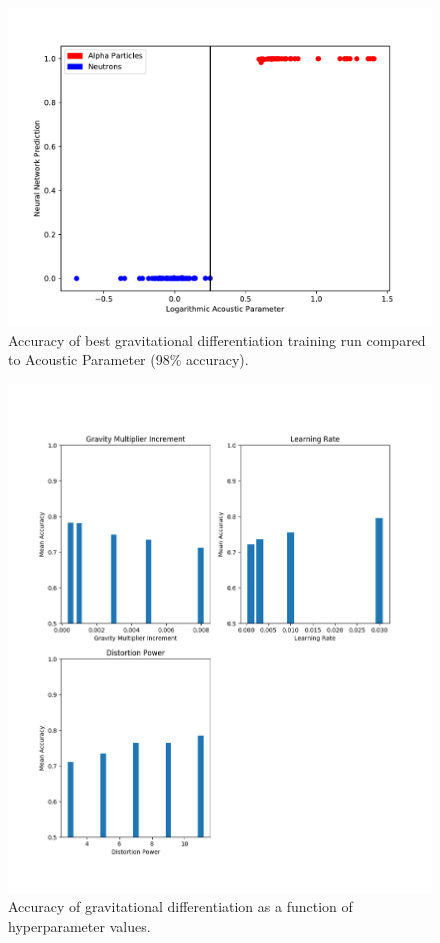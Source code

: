 \documentclass[10pt]{article}
\begin{document}
\begin{figure}[H]
    \centering
    \includegraphics[width=\textwidth]{grav_grid_search}
    \caption{\label{grav_grid_search} Accuracy of best gravitational differentiation training run compared to Acoustic Parameter (98\% accuracy).}
\end{figure}

\begin{figure}[H]
    \centering
    \includegraphics[width=\textwidth]{grav_acc_by_hyper}
    \caption{\label{grav_acc_by_hyper} Accuracy of gravitational differentiation as a function of hyperparameter values.}
\end{figure}
\end{document}
